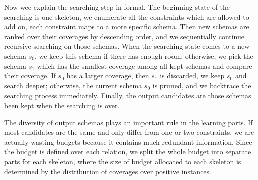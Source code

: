 Now wee explain the searching step in formal.
The beginning state of the searching is one skeleton, we enumerate
all the constraints which are allowed to add on, each constraint 
maps to a more specific schema.
Then new schemas are ranked over their coverages by descending order,
and we sequentially continue recursive searching on those schemas.
When the searching state comes to a new schema $s_0$, we keep this 
schema if there has enough room; otherwise, we pick the schema 
$s_1$ which has the smallest coverage among all kept schemas and 
compare their coverage.
If $s_0$ has a larger coverage, then $s_1$ is discarded, we keep 
$s_0$ and search deeper; otherwise, the current schema $s_0$ is 
pruned, and we backtrace the searching process immediately.
Finally, the output candidates are those schemas been kept when
the searching is over.

The diversity of output schemas plays an important rule in the 
learning parts.
If most candidates are the same and only differ from one or two 
constraints, we are actually wasting budgets because it contains
much redundant information.
Since the budget is defined over each relation, we split the whole 
budget into separate parts for each skeleton, where the size of 
budget allocated to each skeleton is determined by the distribution
of coverages over positive instances.

